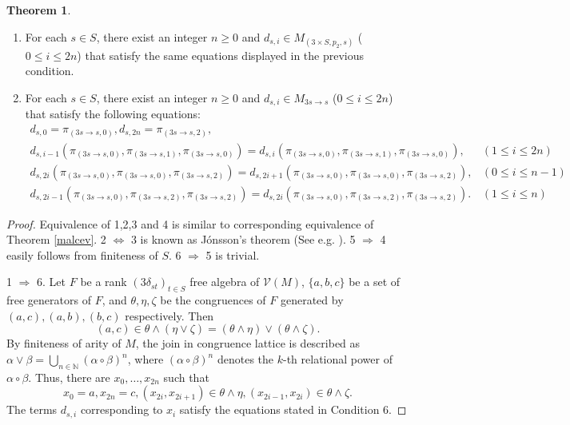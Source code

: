 \documentclass[a4paper,10pt]{article}
\theoremstyle{definition}
\newtheorem{thm}[df]{Theorem}
\newcommand\ra{\rightarrow}
\newcommand\N{\mathbb{N}}
\newcommand\V{\mathcal{V}}
\begin{document}
\begin{thm}
\begin{enumerate}
\begin{align*}
 &\ (1\leq i\leq n)
\end{align*}
\item
For each $s\in S$, there exist an integer $n\geq 0$ and
$d_{s,i}\in M_{(3\times S,p_2,s)}$ ($0\leq i\leq 2n$) that satisfy
the same equations displayed in the previous condition.
\item
For each $s\in S$, there exist an integer $n\geq 0$ and
$d_{s,i}\in M_{3s\ra s}$ ($0\leq i\leq 2n$) that satisfy the following equations:
\[
\begin{array}{cl}
d_{s,0}=\pi_{(3s\ra s,0)},d_{s,2n}=\pi_{(3s\ra s,2)},&\\
d_{s,i-1}(\pi_{(3s\ra s,0)},\pi_{(3s\ra s,1)},\pi_{(3s\ra s,0)})
 =d_{s,i}(\pi_{(3s\ra s,0)},\pi_{(3s\ra s,1)},\pi_{(3s\ra s,0)}),
 &(1\leq i\leq 2n)\\
d_{s,2i}(\pi_{(3s\ra s,0)},\pi_{(3s\ra s,0)},\pi_{(3s\ra s,2)})
 =d_{s,2i+1}(\pi_{(3s\ra s,0)},\pi_{(3s\ra s,0)},\pi_{(3s\ra s,2)}),
 &(0\leq i\leq n-1)\\
d_{s,2i-1}(\pi_{(3s\ra s,0)},\pi_{(3s\ra s,2)},\pi_{(3s\ra s,2)})
 =d_{s,2i}(\pi_{(3s\ra s,0)},\pi_{(3s\ra s,2)},\pi_{(3s\ra s,2)}).
 &(1\leq i\leq n)
\end{array}
\]
\end{enumerate}
\end{thm}
\begin{proof}
Equivalence of 1,2,3 and 4 is similar to corresponding equivalence of Theorem \ref{malcev}. 2 $\Leftrightarrow$ 3 is known as J\'onsson's theorem (See e.g. {\cite[Theorem 12.6]{BS}}).
5 $\Rightarrow$ 4 easily follows from finiteness of $S$.
6 $\Rightarrow$ 5 is trivial.

1 $\Rightarrow$ 6. Let $F$ be a rank $(3\delta_{st})_{t\in S}$ free algebra of $\V(M)$,
$\{a,b,c\}$ be a set of free generators of $F$, and
$\theta,\eta,\zeta$ be the congruences of $F$ generated by $(a,c),(a,b),(b,c)$ respectively.
Then
\[
(a,c)\in \theta\land(\eta\lor\zeta)=(\theta\land\eta)\lor(\theta\land\zeta).
\]
By finiteness of arity of $M$, the join in congruence lattice is described as
$\alpha\lor\beta=\bigcup_{n\in\N}(\alpha\circ\beta)^n$, where $(\alpha\circ\beta)^n$
denotes the $k$-th relational power of $\alpha\circ\beta$.
Thus, there are $x_0,\dots,x_{2n}$ such that
\[
x_0=a,x_{2n}=c,(x_{2i},x_{2i+1})\in\theta\land\eta, (x_{2i-1},x_{2i})\in\theta\land\zeta.
\]
The terms $d_{s,i}$ corresponding to $x_i$ satisfy the equations stated in Condition 6.
\end{proof}
\end{document}
